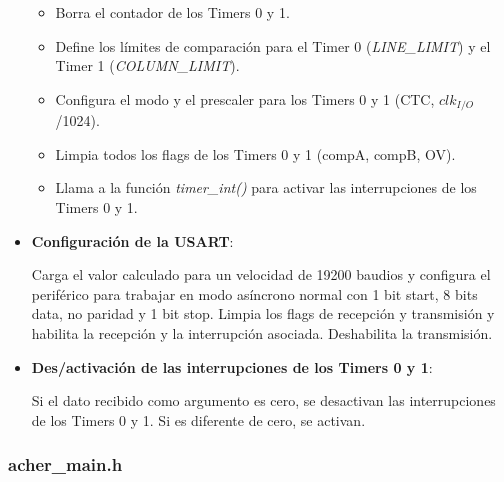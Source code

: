 \begin{itemize}
{  \begin{itemize}
    \item{Borra el contador de los Timers 0 y 1.}
    \item{Define los límites de comparación para el Timer 0 (\textit{LINE\_LIMIT}) y el Timer 1 (\textit{COLUMN\_LIMIT}).}
    \item{Configura el modo y el prescaler para los Timers 0 y 1 (CTC, $clk_{I/O}$/1024).}
    \item{Limpia todos los flags de los Timers 0 y 1 (compA, compB, OV).}
    \item{Llama a la función \textit{timer\_int()} para activar las interrupciones de los Timers 0 y 1.}
  \end{itemize}
}

\item{\textbf{Configuración de la USART}:
  

   Carga el valor calculado para un velocidad de 19200 baudios y configura el periférico para trabajar en modo asíncrono normal con 1 bit start, 8 bits data, no paridad y 1 bit stop. Limpia los flags de recepción y transmisión y habilita la recepción y la interrupción asociada. Deshabilita la transmisión.
}

\item{\textbf{Des/activación de las interrupciones de los Timers 0 y 1}:
  

  Si el dato recibido como argumento es cero, se desactivan las interrupciones de los Timers 0 y 1. Si es diferente de cero, se activan.
}
\end{itemize}

\subsubsection{acher\_main.h}

